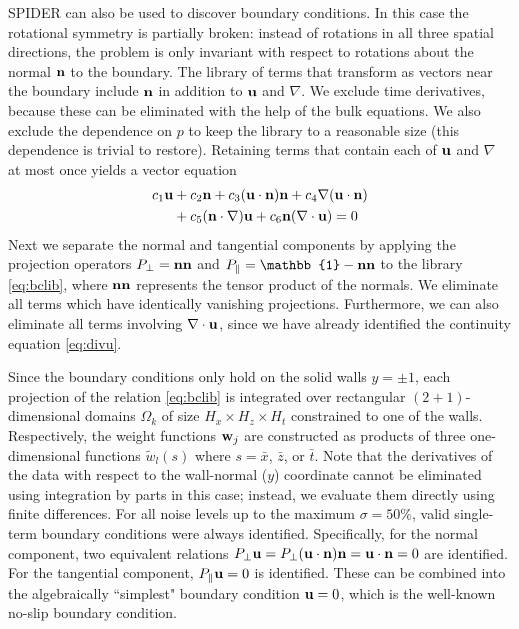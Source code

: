 \documentclass[
 reprint,
 amsmath,amssymb,
 aps,
]{revtex4-2}
\begin{document}
SPIDER can also be used to discover boundary conditions. In this case the rotational symmetry is partially broken: instead of rotations in all three spatial directions, the problem is only invariant with respect to rotations about the normal ${\bf n}$ to the boundary. The library of terms that transform as vectors near the boundary include ${\bf n}$ in addition to ${\bf u}$ and $\nabla$. We exclude time derivatives, because these can be eliminated with the help of the bulk equations. We also exclude the dependence on $p$ to keep the library to a reasonable size (this dependence is trivial to restore). Retaining terms that contain each of ${\bf u}$ and $\nabla$ at most once yields a vector equation
\begin{align}\label{eq:bclib}
    c_1{\bf u}&+c_2{\bf n}+c_3({\bf u} \cdot {\bf n}){\bf n}+c_4\nabla({\bf u} \cdot {\bf n})\nonumber\\&+c_5({\bf n}\cdot \nabla){\bf u}+c_6{\bf n}(\nabla \cdot {\bf u})= 0
\end{align}
Next we separate the normal and tangential components by applying the projection operators $P_\perp={\bf n}{\bf n}$ and $P_\parallel=\mathbb{1}-{\bf n}{\bf n}$ to the library \eqref{eq:bclib}, where ${\bf n}{\bf n}$ represents the tensor product of the normals. We eliminate all terms which have identically vanishing projections. Furthermore, we can also eliminate all terms involving $\nabla\cdot{\bf u}$, since we have already identified the continuity equation \eqref{eq:divu}.

Since the boundary conditions only hold on the solid walls $y=\pm 1$, each projection of the relation \eqref{eq:bclib} is integrated over rectangular $(2+1)$-dimensional domains $\Omega_k$ of size $H_x\times H_z\times H_t$ constrained to one of the walls. Respectively, the weight functions ${\bf w}_j$ are constructed as products of three one-dimensional functions $\tilde{w}_l(s)$ where $s=\bar{x}$, $\bar{z}$, or $\bar{t}$. Note that the derivatives of the data with respect to the wall-normal ($y$) coordinate cannot be eliminated using integration by parts in this case; instead, we evaluate them directly using finite differences.
For all noise levels up to the maximum $\sigma = 50\%$, valid single-term boundary conditions were always identified. Specifically, for the normal component, two equivalent relations $P_\perp {\bf u} = P_\perp ({\bf u} \cdot {\bf n}){\bf n} = {\bf u} \cdot {\bf n} = 0$ are identified. For the tangential component, $P_\parallel {\bf u} = 0$ is identified. These can be combined into the algebraically ``simplest" boundary condition ${\bf u}=0$, which is the well-known no-slip boundary condition.
\end{document}
